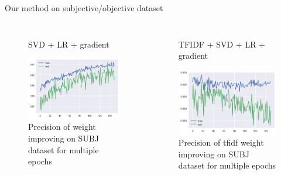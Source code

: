 \documentclass[xcolor={table}]{beamer}
\begin{document}
\begin{frame}{Our method on subjective/objective dataset}
    \begin{columns}
                   \begin{figure}[H]
                    \centering
                    \caption*{SVD + LR + gradient}
                    \includegraphics[height=0.4\textheight]{images/SUBJDataset_grad.png}
                    \caption{Precision of weight improving on SUBJ dataset for multiple epochs}
                \end{figure}

                \begin{figure}[H]
                    \centering
                    \caption*{TFIDF + SVD + LR + gradient}
                    \includegraphics[height=0.4\textheight]{images/SUBJDataset_tfidf_grad.png}
                    \caption{Precision of tfidf weight improving on SUBJ dataset for multiple epochs}
                \end{figure}
    \end{columns}                
\end{frame} 
\end{document}
